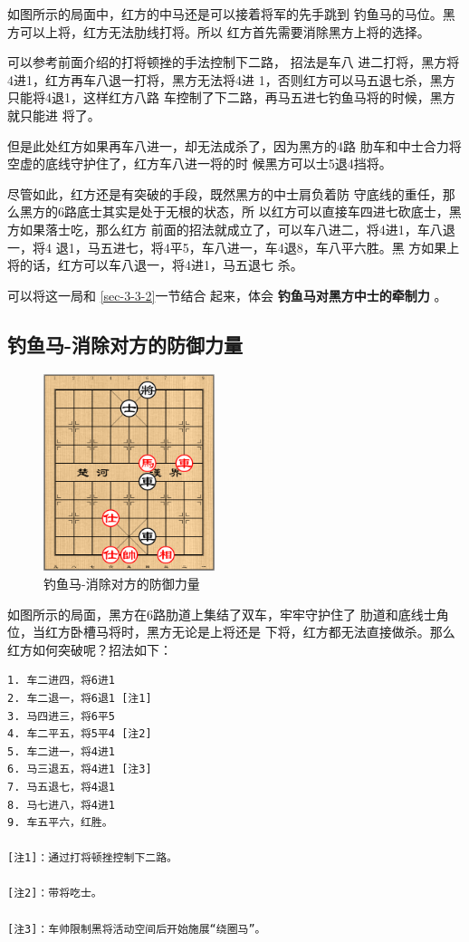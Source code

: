 \documentclass[a5paper,twoside]{book}
\begin{document}
如图所示的局面中，红方的中马还是可以接着将军的先手跳到
钓鱼马的马位。黑方可以上将，红方无法肋线打将。所以
红方首先需要消除黑方上将的选择。

可以参考前面介绍的打将顿挫的手法控制下二路，
招法是车八
进二打将，黑方将4进1，红方再车八退一打将，黑方无法将4进
1，否则红方可以马五退七杀，黑方只能将4退1，这样红方八路
车控制了下二路，再马五进七钓鱼马将的时候，黑方就只能进
将了。

但是此处红方如果再车八进一，却无法成杀了，因为黑方的4路
肋车和中士合力将空虚的底线守护住了，红方车八进一将的时
候黑方可以士5退4挡将。

尽管如此，红方还是有突破的手段，既然黑方的中士肩负着防
守底线的重任，那么黑方的6路底士其实是处于无根的状态，所
以红方可以直接车四进七砍底士，黑方如果落士吃，那么红方
前面的招法就成立了，可以车八进二，将4进1，车八退一，将4
退1，马五进七，将4平5，车八进一，车4退8，车八平六胜。黑
方如果上将的话，红方可以车八退一，将4进1，马五退七
杀。

可以将这一局和 \ref{sec-3-3-2}一节结合
起来，体会 \textbf{钓鱼马对黑方中士的牵制力} 。

\subsection{钓鱼马-消除对方的防御力量}
\label{sec-3-4-2}
\begin{figure}[H]
\centering
\includegraphics[width=5cm]{pic/钓鱼马-消除对方的防御力量.png}
\caption{钓鱼马-消除对方的防御力量}
\end{figure}


如图所示的局面，黑方在6路肋道上集结了双车，牢牢守护住了
肋道和底线士角位，当红方卧槽马将时，黑方无论是上将还是
下将，红方都无法直接做杀。那么红方如何突破呢？招法如下：

\begin{verbatim}
1. 车二进四，将6进1
2. 车二退一，将6退1 [注1]
3. 马四进三，将6平5
4. 车二平五，将5平4 [注2]
5. 车二进一，将4进1
6. 马三退五，将4进1 [注3]
7. 马五退七，将4退1
8. 马七进八，将4进1
9. 车五平六，红胜。

[注1]：通过打将顿挫控制下二路。

[注2]：带将吃士。

[注3]：车帅限制黑将活动空间后开始施展“绕圈马”。
\end{verbatim}
\end{document}
